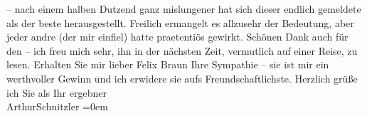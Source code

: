 \begin{ledgroupsized}[t]{13cm}
                    – nach einem halben Dutzend ganz mislungener hat sich dieser endlich gemeldete
                    als der beste herausgestellt. Freilich ermangelt es allzusehr der Bedeutung,
                    aber jeder andre (der mir einfiel) hatte praetentiös gewirkt.\pend
           \pstart
           Schönen Dank auch für den \label{K_L02487_1v}\label{K_L02487_1h} – ich freu mich sehr, ihn in der nächsten Zeit, vermutlich
                    auf einer Reise, zu lesen. Erhalten Sie mir lieber Felix Braun Ihre Sympathie –
                        {\pb}sie ist mir ein werthvoller
                    Gewinn und ich erwidere sie aufs Freundschaftlichste.\pend
           \pstart
           Herzlich grüße ich Sie als Ihr ergebner{\\[\baselineskip]}\spacefill\mbox{ArthurSchnitzler}\pend
           \leftskip=0em{}\endnumbering{}\end{ledgroupsized}  \newcommand{\dateiname}{L02487}\newcommand{\titel}{Arthur Schnitzler an Felix Braun, 28. 5. 1927}\newcommand{\editorInnen}{Martin Anton Müller und Gerd-Hermann Susen}
            \footnotesize
\begin{ledgroupsized}[t]{11.5cm}
\end{ledgroupsized}
         
      